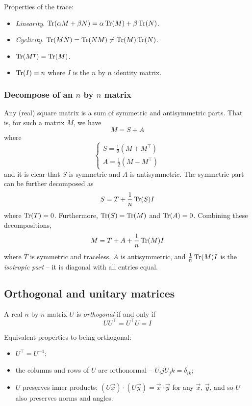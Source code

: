 \documentclass{../../template/note}
\begin{document}
    Properties of the trace:

    \begin{itemize}
        \item \emph{Linearity}. \(\operatorname{Tr}(\alpha M + \beta N) = \alpha \operatorname{Tr}(M) + \beta \operatorname{Tr}(N)\).
        \item \emph{Cyclicity}. \(\operatorname{Tr}(MN) = \operatorname{Tr}(NM) \neq \operatorname{Tr}(M)\operatorname{Tr}(N)\).
        \item \(\operatorname{Tr}(M^\intercal) = \operatorname{Tr}(M)\).
        \item \(\operatorname{Tr}(I) = n\) where \(I\) is the \(n\) by \(n\) identity matrix.
    \end{itemize}
    
    \subsubsection{Decompose of an \(n\) by \(n\) matrix}

    Any (real) square matrix is a sum of symmetric and antisymmetric parts. That is, for such a matrix \(M\), we have
    \[
        M = S + A
    \]
    where
    \[
        \begin{cases}
            S = \frac{1}{2} (M + M^\intercal) \\
            A = \frac{1}{2} (M - M^\intercal)
        \end{cases}
    \]
    and it is clear that \(S\) is symmetric and \(A\) is antisymmetric. The symmetric part can be further decomposed as
    \[
        S = T + \frac 1 n \operatorname{Tr}(S) I
    \]
    where \(\operatorname{Tr}(T) = 0\). Furthermore, \(\operatorname{Tr}(S) = \operatorname{Tr}(M)\) and \(\operatorname{Tr}(A) = 0\). Combining these decompositions,
    \[
        M = T + A + \frac 1 n \operatorname{Tr}(M) I
    \]
    where \(T\) is symmetric and traceless, \(A\) is antisymmetric, and \(\frac 1 n \operatorname{Tr}(M) I\) is the \emph{isotropic part} -- it is diagonal with all entries equal.

    
    \subsection{Orthogonal and unitary matrices}

    \begin{definition}
        A real \(n\) by \(n\) matrix \(U\) is \emph{orthogonal} if and only if
        \[
            UU^\intercal = U^\intercal U = I
        \]
    \end{definition}
    Equivalent properties to being orthogonal:
    \begin{itemize}
        \item \(U^\intercal = U^{-1}\);
        \item the columns and rows of \(U\) are orthonormal -- \(U_ijU_jk = \delta_{ik}\);
        \item \(U\) preserves inner products: \((U \vec x) \cdot (U \vec y) = \vec x \cdot \vec y\) for any \(\vec x\), \(\vec y\), and so \(U\) also preserves norms and angles.
    \end{itemize}
    
\end{document}
